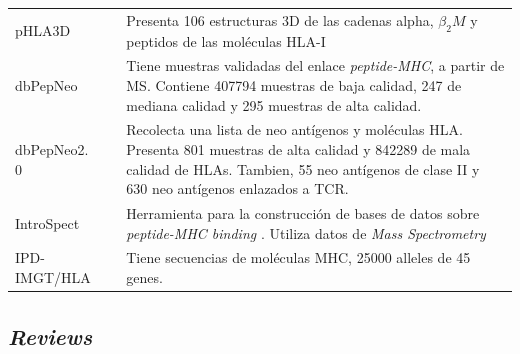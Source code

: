 \begin{table}[H]
\begin{tabular}{lp{3cm}p{8cm}}
		pHLA3D          & \cite{e2019phla3d}                                              & Presenta 106 estructuras 3D de las cadenas alpha, $\beta_2M$ y peptidos de las moléculas HLA-I                                                                                                               \\
		dbPepNeo        & \cite{tan2020dbpepneo}                                          & Tiene muestras validadas del enlace \textit{peptide-MHC}, a partir de MS. Contiene 407794 muestras de baja calidad, 247 de mediana calidad y 295 muestras de alta calidad.                                         \\
		dbPepNeo2. 0    & \cite{lu2022dbpepneo2}                                          & Recolecta una lista de neo antígenos y moléculas HLA. Presenta 801 muestras de alta calidad y 842289  de mala calidad de HLAs. Tambien, 55 neo antígenos de clase II y 630 neo antígenos enlazados a TCR. \\
		
		IntroSpect      & \cite{zhang2022introspect}                                      & Herramienta para la construcción de bases de datos sobre \textit{peptide-MHC binding} . Utiliza datos de \textit{Mass Spectrometry}     \\
		
		IPD-IMGT/HLA & \cite{robinson2020ipd}    &             Tiene secuencias de moléculas MHC, 25000 alleles de 45 genes.                                                                                     
	\end{tabular}
\end{table}



\subsection{\textit{Reviews}}



